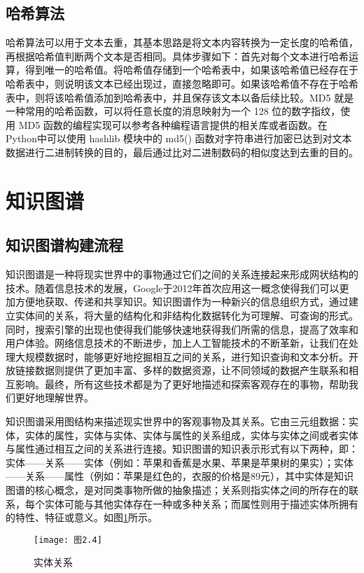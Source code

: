 \documentclass[bachelor_p]{hdu-thesis}
\begin{document}
\subsection{哈希算法}

哈希算法可以用于文本去重，其基本思路是将文本内容转换为一定长度的哈希值，再根据哈希值判断两个文本是否相同。具体步骤如下：首先对每个文本进行哈希运算，得到唯一的哈希值。将哈希值存储到一个哈希表中，如果该哈希值已经存在于哈希表中，则说明该文本已经出现过，直接忽略即可。如果该哈希值不存在于哈希表中，则将该哈希值添加到哈希表中，并且保存该文本以备后续比较。MD5 就是一种常用的哈希函数，可以将任意长度的消息映射为一个 128 位的数字指纹，使用 MD5 函数的编程实现可以参考各种编程语言提供的相关库或者函数。在Python中可以使用 hashlib 模块中的 md5() 函数对字符串进行加密已达到对文本数据进行二进制转换的目的，最后通过比对二进制数码的相似度达到去重的目的。

\section{知识图谱}
\subsection{知识图谱构建流程}
知识图谱是一种将现实世界中的事物通过它们之间的关系连接起来形成网状结构的技术。随着信息技术的发展，Google于2012年首次应用这一概念\cite{mastersthesis23}使得我们可以更加方便地获取、传递和共享知识。知识图谱作为一种新兴的信息组织方式，通过建立实体间的关系，将大量的结构化和非结构化数据转化为可理解、可查询的形式。同时，搜索引擎的出现也使得我们能够快速地获得我们所需的信息，提高了效率和用户体验。网络信息技术的不断进步，加上人工智能技术的不断革新，让我们在处理大规模数据时，能够更好地挖掘相互之间的关系，进行知识查询和文本分析。开放链接数据则提供了更加丰富、多样的数据资源，让不同领域的数据产生联系和相互影响。最终，所有这些技术都是为了更好地描述和探索客观存在的事物，帮助我们更好地理解世界。

知识图谱采用图结构来描述现实世界中的客观事物及其关系。它由三元组数据：实体，实体的属性，实体与实体、实体与属性的关系组成，实体与实体之间或者实体与属性通过相互之间的关系进行连接。知识图谱的知识表示形式有以下两种，即：实体——关系——实体（例如：苹果和香蕉是水果、苹果是苹果树的果实）；实体——关系——属性（例如：苹果是红色的，衣服的价格是89元），其中实体是知识图谱的核心概念，是对同类事物所做的抽象描述；关系则指实体之间的所存在的联系，每个实体可能与其他实体存在一种或多种关系；而属性则用于描述实体所拥有的特性、特征或意义。如图\ref{fig:graph.24}所示。

\begin{figure}[h]
  \centering
  \texttt{[image: 图2.4]}
  \caption{实体关系} \label{fig:graph.24}
\end{figure}
\end{document}
